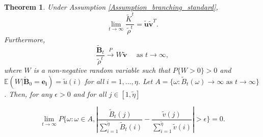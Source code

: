\documentclass{article}
\newtheorem{theorem}{Theorem}[section]
\theoremstyle{definition}
\newcommand{\lrp}[1]{\left({#1}\right)}
\newcommand{\abs}[1]{\left\lvert{#1}\right\rvert}
\newcommand{\Exp}[1]{\mathbb{E}\lrp{#1}}
\begin{document}
\begin{theorem}
Under Assumption \ref{Assumption_branching_standard},
\[
\lim_{t \to \infty} \frac{\tilde{K}^t}{\tilde{\rho}^t} = \bm{\tilde{u}}\bm{\tilde{v}}^T.
\]
Furthermore, 
      \begin{equation} \label{eq:0001}
       \frac{\bm{\tilde{B}}_t}{\tilde{\rho}^t} \xrightarrow{P} W\bm{\tilde{v}} \quad \text{ as } t \to \infty,
       \end{equation} 
      where $W$ is a non-negative random variable such that $P\{W>0\}>0$ and $\Exp{W|\bm{\tilde{B}}_0=\bm{e_i}} =\tilde{u}(i)$ for all $i=1,...,\eta$. 
      Let $A=\{\omega:\tilde{B}_t(\omega) \to \infty \mbox{ as }t \to \infty\}$. Then, for any $\epsilon > 0$ and for all $j\in[1, \tilde{\eta}]$
  
 \begin{equation}\lim_{t\to \infty} P \{ \omega : \omega \in A, \abs{\frac{{\tilde{B}}_t(j)}{\sum_{i=1}^{ \tilde{\eta}}\tilde{B}_t(i)}-\frac{{\tilde{v}(j)}}{\sum_{i=1}^{ \tilde{\eta}}\tilde{v}(i)}}>\epsilon \}=0.
 \label{proportion_stbp}
 \end{equation}
  \label{stbp_theorem}
\end{theorem}

\end{document}
